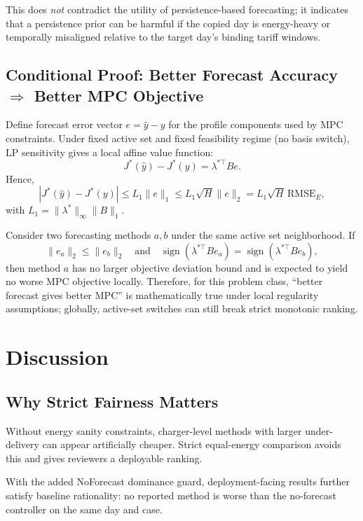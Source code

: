 \documentclass[journal]{IEEEtran}
\newcommand{\RMSE}{\mathrm{RMSE}}
\begin{document}
This does \emph{not} contradict the utility of persistence-based forecasting; it indicates that a persistence prior can be harmful if the copied day is energy-heavy or temporally misaligned relative to the target day's binding tariff windows.

\subsection{Conditional Proof: Better Forecast Accuracy $\Rightarrow$ Better MPC Objective}
Define forecast error vector $e=\hat{y}-y$ for the profile components used by MPC constraints. Under fixed active set and fixed feasibility regime (no basis switch), LP sensitivity gives a local affine value function:
\begin{equation}
J^*(\hat{y})-J^*(y)=\lambda^{*\top}B e.
\end{equation}
Hence,
\begin{equation}
|J^*(\hat{y})-J^*(y)|\le L_1\|e\|_1\le L_1\sqrt{H}\|e\|_2 = L_1\sqrt{H}\,\RMSE_E,
\end{equation}
with $L_1=\|\lambda^*\|_\infty\|B\|_1$.

Consider two forecasting methods $a,b$ under the same active set neighborhood. If
\begin{equation}
\|e_a\|_2\le \|e_b\|_2
\quad\text{and}\quad
\operatorname{sign}(\lambda^{*\top}Be_a)=\operatorname{sign}(\lambda^{*\top}Be_b),
\end{equation}
then method $a$ has no larger objective deviation bound and is expected to yield no worse MPC objective locally. Therefore, for this problem class, ``better forecast gives better MPC'' is mathematically true under local regularity assumptions; globally, active-set switches can still break strict monotonic ranking.

\section{Discussion}

\subsection{Why Strict Fairness Matters}
Without energy sanity constraints, charger-level methods with larger under-delivery can appear artificially cheaper. Strict equal-energy comparison avoids this and gives reviewers a deployable ranking.

With the added NoForecast dominance guard, deployment-facing results further satisfy baseline rationality: no reported method is worse than the no-forecast controller on the same day and case.
\end{document}
